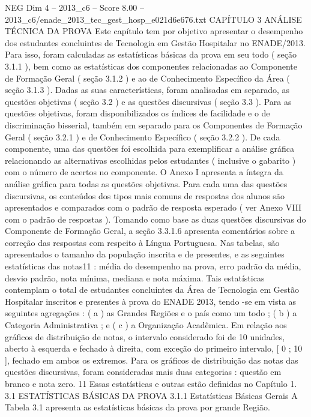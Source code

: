 \begin{textsample}{NEG Dim 4 – 2013\_c6 – Score 8.00 – 2013\_c6/enade\_2013\_tec\_gest\_hosp\_e021d6e676.txt}  \label{ex:f4_neg_317}
CAPÍTULO 3 ANÁLISE TÉCNICA DA PROVA Este capítulo tem por objetivo apresentar o desempenho dos estudantes concluintes de Tecnologia em Gestão Hospitalar no ENADE/2013.
Para isso, foram calculadas as estatísticas básicas da prova em seu todo ( seção 3.1.1 ), bem como as estatísticas dos componentes relacionadas ao Componente de Formação Geral ( seção 3.1.2 ) e ao de Conhecimento Específico da Área ( seção 3.1.3 ).
Dadas as suas características, foram analisadas em separado, as questões objetivas ( seção 3.2 ) e as questões discursivas ( seção 3.3 ).
Para as questões objetivas, foram disponibilizados os índices de facilidade e o de discriminação bisserial, também em separado para os Componentes de Formação Geral ( seção 3.2.1 ) e de Conhecimento Específico ( seção 3.2.2 ).
De cada componente, uma das questões foi escolhida para exemplificar a análise gráfica relacionando as alternativas escolhidas pelos estudantes ( inclusive o gabarito ) com o número de acertos no componente.
O Anexo I apresenta a íntegra da análise gráfica para todas as questões objetivas.
Para cada uma das questões discursivas, os conteúdos dos tipos mais comuns de respostas dos alunos são apresentados e comparados com o padrão de resposta esperado ( ver Anexo VIII com o padrão de respostas ).
Tomando como base as duas questões discursivas do Componente de Formação Geral, a seção 3.3.1.6 apresenta comentários sobre a correção das respostas com respeito à Língua Portuguesa.
Nas tabelas, são apresentados o tamanho da população inscrita e de presentes, e as seguintes estatísticas das notas11 : média do desempenho na prova, erro padrão da média, desvio padrão, nota mínima, mediana e nota máxima.
Tais estatísticas contemplam o total de estudantes concluintes da Área de Tecnologia em Gestão Hospitalar inscritos e presentes à prova do ENADE 2013, tendo -se em vista as seguintes agregações : ( a ) as Grandes Regiões e o país como um todo ; ( b ) a Categoria Administrativa ; e ( c ) a Organização Acadêmica.
Em relação aos gráficos de distribuição de notas, o intervalo considerado foi de 10 unidades, aberto à esquerda e fechado à direita, com exceção do primeiro intervalo, [ 0 ; 10 ], fechado em ambos os extremos.
Para os gráficos de distribuição das notas das questões discursivas, foram consideradas mais duas categorias : questão em branco e nota zero. 11 Essas estatísticas e outras estão definidas no Capítulo 1. 3.1 ESTATÍSTICAS BÁSICAS DA PROVA 3.1.1 Estatísticas Básicas Gerais A Tabela 3.1 apresenta as estatísticas básicas da prova por grande Região.

\end{textsample}
